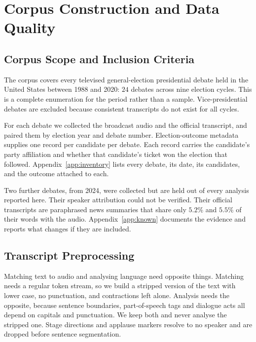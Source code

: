 \documentclass[pdflatex,sn-mathphys-num]{sn-jnl}%
\begin{document}
\section{Corpus Construction and Data Quality}
\label{sec:data}

\subsection{Corpus Scope and Inclusion Criteria}
\label{sec:data:collect}

The corpus covers every televised general-election presidential debate held in
the United States between 1988 and 2020: $24$ debates across nine election
cycles. This is a complete enumeration for the period rather than a sample.
Vice-presidential debates are excluded because consistent transcripts do not
exist for all cycles.

For each debate we collected the broadcast audio and the official transcript,
and paired them by election year and debate number. Election-outcome metadata
supplies one record per candidate per debate. Each record carries the
candidate's party affiliation and whether that candidate's ticket won the
election that followed.
Appendix~\ref{app:inventory} lists every debate, its date, its candidates, and
the outcome attached to each.

Two further debates, from 2024, were collected but are held out of every
analysis reported here. Their speaker attribution could not be verified.
Their official transcripts are paraphrased news summaries that share only
$5.2\%$ and $5.5\%$ of their words with the audio. Appendix~\ref{app:known}
documents the evidence and reports what changes if they are included.

\subsection{Transcript Preprocessing}
\label{sec:data:prep}

Matching text to audio and analysing language need opposite things. Matching
needs a regular token stream, so we build a stripped version of the text with
lower case, no punctuation, and contractions left alone. Analysis needs the opposite, because
sentence boundaries, part-of-speech tags and dialogue acts all depend on
capitals and punctuation. We keep both and never analyse the stripped one.
Stage directions and applause markers resolve to no speaker and are dropped
before sentence segmentation.
\end{document}

